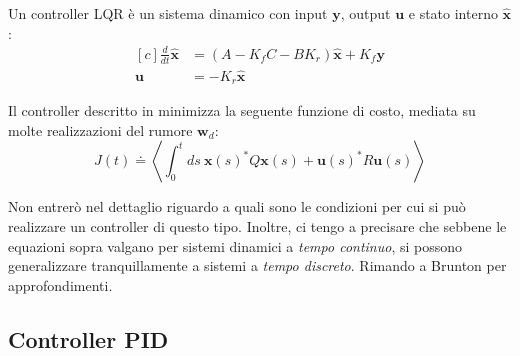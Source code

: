 \begin{framed} %
  Un controller \textsc{LQR} è un sistema dinamico con input $\mathbf y$, output $\mathbf u$ e stato interno
  $\hat{\mathbf x}$: %
  \begin{equation}
    \begin{aligned}[c]
      \frac d {dt} \hat {\mathbf x} &= (A-K_f C - B K_r) \hat{\mathbf x} + K_f \mathbf y \\ %
      \mathbf u               &= -K_r \hat{\mathbf x}
    \end{aligned}
    \label{eq:lqg}
  \end{equation}
\end{framed}
\begin{framed} %
  Il controller descritto in %
  minimizza la seguente funzione di costo, mediata su molte realizzazioni del rumore $\mathbf w_d$:
  \begin{equation}
    J(t) \doteq \left<
      \int_0^t  ds\ \mathbf{x} (s)^* Q \mathbf {x} (s) + \mathbf {u} (s)^* R \mathbf {u} (s) %
    \right>
    \label{eq:lqg-costo}
  \end{equation}
\end{framed}

Non entrerò nel dettaglio riguardo a quali sono le condizioni per cui si può realizzare un controller di questo tipo.
Inoltre, ci tengo a precisare che sebbene le equazioni sopra %
valgano per sistemi dinamici a \emph{tempo continuo}, si possono generalizzare tranquillamente a sistemi
a \emph{tempo discreto}.
Rimando a Brunton%
per approfondimenti.

\subsection{Controller \textsc{PID}}\label{subsec:intro-pid}
